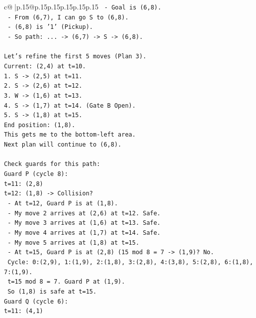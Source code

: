 \documentclass{article}
\begin{document}
{\begin{supertabular}{c@{$\;$}|p{.15\linewidth}@{}p{.15\linewidth}p{.15\linewidth}p{.15\linewidth}p{.15\linewidth}p{.15\linewidth}}
{{{\texttt{   {-} Goal is (6,8).} \\
\texttt{   {-} From (6,7), I can go S to (6,8).} \\
\texttt{   {-} (6,8) is '1' (Pickup).} \\
\texttt{   {-} So path: ... {-}> (6,7) {-}> S {-}> (6,8).} \\
\\ 
\texttt{Let's refine the first 5 moves (Plan 3).} \\
\texttt{Current: (2,4) at t=10.} \\
\texttt{1. S {-}> (2,5) at t=11.} \\
\texttt{2. S {-}> (2,6) at t=12.} \\
\texttt{3. W {-}> (1,6) at t=13.} \\
\texttt{4. S {-}> (1,7) at t=14. (Gate B Open).} \\
\texttt{5. S {-}> (1,8) at t=15.} \\
\texttt{End position: (1,8).} \\
\texttt{This gets me to the bottom{-}left area.} \\
\texttt{Next plan will continue to (6,8).} \\
\\ 
\texttt{Check guards for this path:} \\
\texttt{Guard P (cycle 8):} \\
\texttt{t=11: (2,8)} \\
\texttt{t=12: (1,8) {-}> Collision?} \\
\texttt{   {-} At t=12, Guard P is at (1,8).} \\
\texttt{   {-} My move 2 arrives at (2,6) at t=12. Safe.} \\
\texttt{   {-} My move 3 arrives at (1,6) at t=13. Safe.} \\
\texttt{   {-} My move 4 arrives at (1,7) at t=14. Safe.} \\
\texttt{   {-} My move 5 arrives at (1,8) at t=15.} \\
\texttt{   {-} At t=15, Guard P is at (2,8) (15 mod 8 = 7 {-}> (1,9)? No.} \\
\texttt{     Cycle: 0:(2,9), 1:(1,9), 2:(1,8), 3:(2,8), 4:(3,8), 5:(2,8), 6:(1,8), 7:(1,9).} \\
\texttt{     t=15 mod 8 = 7. Guard P at (1,9).} \\
\texttt{     So (1,8) is safe at t=15.} \\
\texttt{Guard Q (cycle 6):} \\
\texttt{t=11: (4,1)} \\
}}}
\end{supertabular}}
\end{document}
